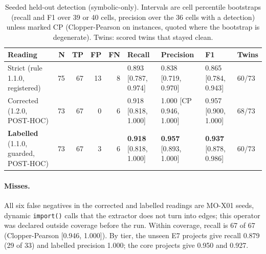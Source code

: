 \documentclass[10pt,a4paper]{article}
\begin{document}
\begin{table}[t]
\centering
\caption{Seeded held-out detection (symbolic-only). Intervals are cell percentile bootstraps (recall and F1 over
39 or 40 cells, precision over the 36 cells with a detection) unless marked CP (Clopper-Pearson on instances, quoted
where the bootstrap is degenerate). Twins: scored twins that stayed clean.}
\label{tab:so4}
\small
\begin{tabular}{@{}lrrrrllll@{}}
\toprule
Reading & N & TP & FP & FN & Recall & Precision & F1 & Twins \\
\midrule
Strict (rule 1.1.0, registered) & 75 & 67 & 13 & 8 & 0.893 [0.787, 0.974] & 0.838 [0.719, 0.970] & 0.865 [0.784, 0.943] & 60/73 \\
Corrected (1.2.0, POST-HOC) & 73 & 67 & 0 & 6 & 0.918 [0.818, 1.000] & 1.000 [CP 0.946, 1.000] & 0.957 [0.900, 1.000] & 68/73 \\
\textbf{Labelled} (1.1.0, guarded, POST-HOC) & 73 & 67 & 3 & 6 & \textbf{0.918} [0.818, 1.000] & \textbf{0.957} [0.893, 1.000] & \textbf{0.937} [0.878, 0.986] & 60/73 \\
\bottomrule
\end{tabular}
\end{table}

\paragraph{Misses.} All six false negatives in the corrected and labelled readings are MO-X01 seeds, dynamic
\texttt{import()} calls that the extractor does not turn into edges; this operator was declared outside coverage
before the run. Within coverage, recall is 67 of 67 (Clopper-Pearson [0.946, 1.000]).
By tier, the unseen E7 projects give recall 0.879 (29 of 33) and labelled precision 1.000; the core projects give
0.950 and 0.927. %
\end{document}
